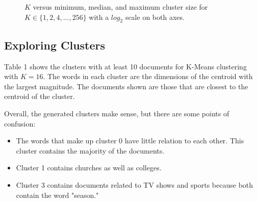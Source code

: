 \documentclass{article} %
\begin{document}
\begin{figure}[h]
\begin{center}
\end{center}
\caption{$K$ versus minimum, median, and maximum cluster size for $K \in \{1,2,4,...,256\}$ with a $log_{2}$ scale on both axes.}
\end{figure}

\subsection{Exploring Clusters}

Table 1 shows the clusters with at least 10 documents for K-Means clustering with $K=16$. The words in each cluster are the dimensions of the centroid with the largest magnitude. The documents shown are those that are closest to the centroid of the cluster.

Overall, the generated clusters make sense, but there are some points of confusion:

\begin{itemize}
\item The words that make up cluster 0 have little relation to each other. This cluster contains the majority of the documents.
\item Cluster 1 contains churches as well as colleges.
\item Cluster 3 contains documents related to TV shows and sports because both contain the word "season."
\end{itemize}
\end{document}
